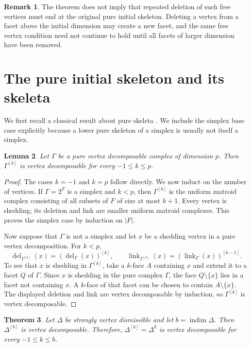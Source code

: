 \documentclass[11pt]{amsart}
\DeclareMathOperator{\indim}{indim}
\DeclareMathOperator{\link}{link}
\DeclareMathOperator{\del}{del}
\newtheorem{theorem}{Theorem}[section]
\newtheorem{lemma}[theorem]{Lemma}
\theoremstyle{definition}
\newtheorem{remark}[theorem]{Remark}
\begin{document}
	\begin{remark}\label{rem:1}
		The theorem does not imply that repeated deletion of such free vertices must end at the original pure initial skeleton. Deleting a vertex from a facet above the initial dimension may create a new facet, and the same free vertex condition need not continue to hold until all facets of larger dimension have been removed.
	\end{remark}
	
	\section{The pure initial skeleton and its skeleta}\label{sec:4}
	
	We first recall a classical result about pure skeleta \cite{ProvanBillera1980}. We include the simplex base case explicitly because a lower pure skeleton of a simplex is usually not itself a simplex.
	
	\begin{lemma}\label{lem:3}
		Let $\Gamma$ be a pure vertex decomposable complex of dimension $p$.  Then $\Gamma^{[k]}$ is vertex decomposable for every $-1\leq k\leq p$.
	\end{lemma}
	
	\begin{proof}
		The cases $k=-1$ and $k=p$ follow directly.  We now induct on the number of vertices.  If $\Gamma=2^F$ is a simplex and $k<p$, then $\Gamma^{[k]}$ is the uniform matroid complex consisting of all subsets of $F$ of size at most $k+1$.  Every vertex is shedding; its deletion and link are smaller uniform matroid complexes.  This proves the simplex case by induction on $|F|$.
		
		Now suppose that $\Gamma$ is not a simplex and let $x$ be a shedding vertex in a pure vertex decomposition.  For $k<p$,
		\[
		\del_{\Gamma^{[k]}}(x)=(\del_\Gamma(x))^{[k]},
		\qquad
		\link_{\Gamma^{[k]}}(x)=(\link_\Gamma(x))^{[k-1]}.
		\]
		To see that $x$ is shedding in $\Gamma^{[k]}$, take a $k$-face $A$ containing $x$ and extend it to a facet $Q$ of $\Gamma$.  Since $x$ is shedding in the pure complex $\Gamma$, the face $Q\setminus\{x\}$ lies in a facet not containing $x$.  A $k$-face of that facet can be chosen to contain $A\setminus\{x\}$.  The displayed deletion and link are vertex decomposable by induction, so $\Gamma^{[k]}$ is vertex decomposable.
	\end{proof}
	
	\begin{theorem}\label{thm:3}
		Let $\Delta$ be strongly vertex dismissible and let $b=\indim\Delta$.  Then $\Delta^{[b]}$ is vertex decomposable.  Therefore, $\Delta^{[k]}=\Delta^k$ is vertex decomposable for every $-1\leq k\leq b$.
	\end{theorem}
	
\end{document}
